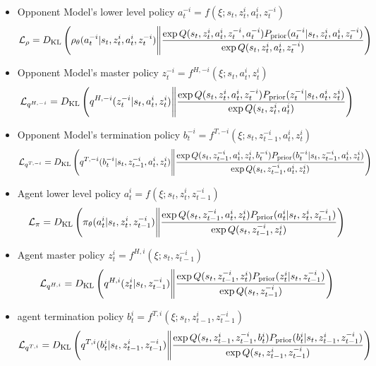 \begin{itemize}
    \item Opponent Model's lower level policy $a^{-i}_t = f(\xi ; s_t, z^i_t, a^{i}_t, z^{-i}_t)$
    \begin{equation}
        \mathcal{L}_{\rho} = D_{\mathrm{KL}}\left( \rho_\theta(a^{-i}_t | s_t, z^i_t, a^{i}_t, z^{-i}_t) \Bigg\|  \frac{\exp Q(s_t, z^i_t, a^{i}_t, z^{-i}_t, a^{-i}_t) P_{\text{prior}}(a^{-i}_t | s_t, z^i_t, a^{i}_t, z^{-i}_t)}{\exp Q(s_t, z^i_t, a^{i}_t, z^{-i}_t)}  \right)
    \end{equation}
    \item Opponent Model's master policy $z^{-i}_t = f^{H, -i}(\xi;  s_t, a^i_t, z^i_t)$
    \begin{equation}
        \mathcal{L}_{q^{H, -i}} = D_{\mathrm{KL}}\left( q^{H, -i}(z_t^{-i} | s_t, a^i_t, z^i_t) \Bigg\| \frac{\exp Q(s_t, z^i_t, a^{i}_t, z^{-i}_t) P_{\text{prior}}(z_t^{-i} | s_t, a^i_t, z^i_t)}{\exp Q(s_t, z^i_t, a^{i}_t)}  \right)
    \end{equation}
    \item Opponent Model's termination policy $b^{-i}_t= f^{T, -i}(\xi; s_t,  z^{-i}_{t-1}, a^i_t, z^i_t)$
    \begin{equation}
        \mathcal{L}_{q^{T,-i}} = D_{\mathrm{KL}}\left( q^{T,-i}(b^{-i}_t | s_t,  z^{-i}_{t-1}, a^i_t, z^i_t) \Bigg\| \frac{\exp Q(s_t,  z^{-i}_{t-1}, a^i_t, z^i_t, b^{-i}_t) P_{\text{prior}}(b^{-i}_t | s_t,  z^{-i}_{t-1}, a^i_t, z^i_t)}{\exp Q(s_t,  z^{-i}_{t-1}, a^i_t, z^i_t)}  \right)
    \end{equation}
    \item Agent lower level policy $a^i_t= f(\xi; s_t, z^i_t, z^{-i}_{t-1})$
    \begin{equation}
        \mathcal{L}_{\pi} = D_{\mathrm{KL}}\left(  \pi_\theta(a^i_t | s_t, z^i_t, z^{-i}_{t-1}) \Bigg\| \frac{\exp Q(s_t,  z^{-i}_{t-1}, a^i_t, z^i_t) P_{\text{prior}}(a^i_t | s_t, z^i_t, z^{-i}_{t-1})}{\exp Q(s_t,  z^{-i}_{t-1}, z^i_t)}  \right)
    \end{equation}
    \item Agent master policy $z^i_t= f^{H, i}(\xi; s_t, z^{-i}_{t-1})$
    \begin{equation}
        \mathcal{L}_{q^{H, i}} = D_{\mathrm{KL}}\left( q^{H, i}(z_t^i | s_t, z^{-i}_{t-1}) \Bigg\| \frac{\exp Q(s_t,  z^{-i}_{t-1}, z^i_t) P_{\text{prior}}(z_t^i | s_t, z^{-i}_{t-1})}{\exp Q(s_t,  z^{-i}_{t-1})}  \right)
    \end{equation}
    \item agent termination policy $b^i_t= f^{T, i}(\xi;s_t, z^i_{t-1}, z^{-i}_{t-1})$
    \begin{equation}
        \mathcal{L}_{q^{T,i}} = D_{\mathrm{KL}}\left( q^{T,i}(b^i_t | s_t, z^i_{t-1}, z^{-i}_{t-1}) \Bigg\| \frac{\exp Q(s_t, z^i_{t-1}, z^{-i}_{t-1}, b^i_t) P_{\text{prior}}(b^i_t | s_t, z^i_{t-1}, z^{-i}_{t-1})}{\exp Q(s_t, z^i_{t-1}, z^{-i}_{t-1}) }  \right)
    \end{equation}
\end{itemize}
